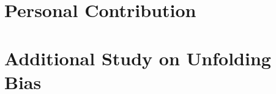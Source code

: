 \section{Personal Contribution}
\label{Appendix:Contribution}

\section{Additional Study on Unfolding Bias}
\label{Appendix:Unfolding_bias}
